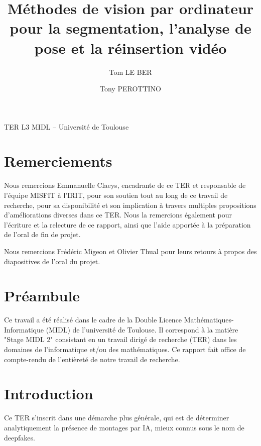 \documentclass[11pt,a4paper]{article}
\title{Méthodes de vision par ordinateur pour la segmentation, l'analyse de pose et la réinsertion vidéo}
\author{Tom LE BER \and Tony PEROTTINO}
\date{}
\begin{document}
\pagestyle{empty}

\maketitle
\begin{center}
TER L3 MIDL -- Université de Toulouse
\end{center}

\newpage

\section*{Remerciements}

Nous remercions Emmanuelle Claeys, encadrante de ce TER et responsable de l'équipe MISFIT à l'IRIT, pour son soutien tout au long de ce travail de recherche, pour sa disponibilité et son implication à travers multiples propositions d'améliorations diverses dans ce TER.  
Nous la remercions également pour l'écriture et la relecture de ce rapport, ainsi que l'aide apportée à la préparation de l'oral de fin de projet.

Nous remercions Frédéric Migeon et Olivier Thual pour leurs retours à propos des diapositives de l'oral du projet. 

\clearpage
\begingroup
\setlength{\parskip}{0pt}
\setlength{\parindent}{0pt}
\tableofcontents
\endgroup
\clearpage

\setcounter{page}{1}
\pagestyle{plain}

\section*{Préambule}
Ce travail a été réalisé dans le cadre de la Double Licence Mathématiques-Informatique (MIDL) de l'université de Toulouse.
Il correspond à la matière "Stage MIDL 2" consistant en un travail dirigé de recherche (TER) dans les domaines de l'informatique et/ou des mathématiques.
Ce rapport fait office de compte-rendu de l'entièreté de notre travail de recherche.

\section{Introduction}
Ce TER s'inscrit dans une démarche plus générale, qui est de déterminer analytiquement la présence de montages par IA, mieux connus sous le nom de deepfakes.
\end{document}
